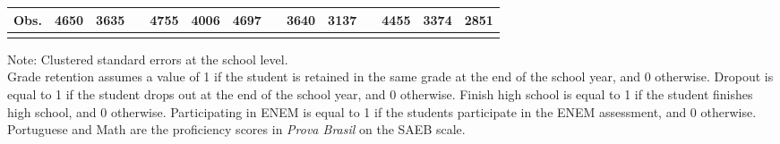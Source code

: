 \begin{landscape}
\begin{table}[ht]
\begin{threeparttable}
\begin{tabular}{lccccccccccccc}
      Obs. &       4650 &       3635 &            &       4755 &       4006 &       4697 &            &       3640 &       3137 &            &       4455 &       3374 &       2851 \\
\hline
\hline 
\label{tab:long-lasting}
\end{tabular}  
 \begin{tablenotes}
    \fontsize{9}{9}\selectfont 
    \item Note: Clustered standard errors at the school level. \\
    Grade retention assumes a value of 1 if the student is retained in the same grade at the end of the school year, and 0 otherwise. Dropout is equal to 1 if the student drops out at the end of the school year, and 0 otherwise. Finish high school is equal to 1 if the student finishes high school, and 0 otherwise. Participating in ENEM is equal to 1 if the students participate in the ENEM assessment, and 0 otherwise. Portuguese and Math are the proficiency scores in \textit{Prova Brasil} on the SAEB scale. 
      
\end{tablenotes}
\end{threeparttable}
\end{table}
\end{landscape}